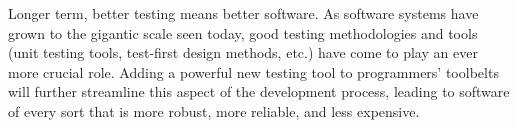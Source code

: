 Longer term, better testing means better software.  As software
systems have grown to the gigantic scale seen today, good testing
methodologies and tools (unit testing tools, test-first design
methods, etc.) have come to play an ever more crucial role.  Adding a
powerful new testing tool to programmers' toolbelts will further streamline
this aspect of the development process, leading to software of every
sort that is more robust, more reliable, and less expensive.






